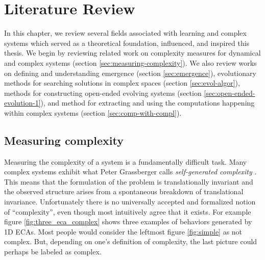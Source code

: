 \chapter{Literature Review}
\label{cha:literature-review}

In this chapter, we review several fields associated with learning and complex
systems which served as a theoretical foundation, influenced, and inspired this
thesis. We begin by reviewing related work on complexity measures for dynamical
and complex systems (section \ref{sec:measuring-complexity}). We also review
works on defining and understanding emergence (section \ref{sec:emergence}),
evolutionary methods for searching solutions in complex spaces (section
\ref{sec:evol-algor}), methods for constructing open-ended evolving systems
(section \ref{sec:open-ended-evolution-1}), and method for extracting and using
the computations happening within complex systems (section
\ref{sec:comp-with-compl}).

\section{Measuring complexity\label{sec:measuring-complexity}}

Measuring the complexity of a system is a fundamentally difficult task. Many
complex systems exhibit what Peter Grassberger calls \emph{self-generated
  complexity} \parencite{grassbergerQuantitativeTheorySelfgenerated1986}. This
means that the formulation of the problem is translationally invariant and the
observed structure arises from a spontaneous breakdown of translational
invariance. Unfortunately there is no universally accepted and formalized notion
of ``complexity'', even though most intuitively agree that it exists. For
example figure \ref{fig:three_eca_complex} shows three examples of behaviors
generated by 1D \acp{ECA}. Most people would consider the leftmost figure
\ref{fig:simple} as not complex. But, depending on one's definition of
complexity, the last picture could perhaps be labeled as complex.

